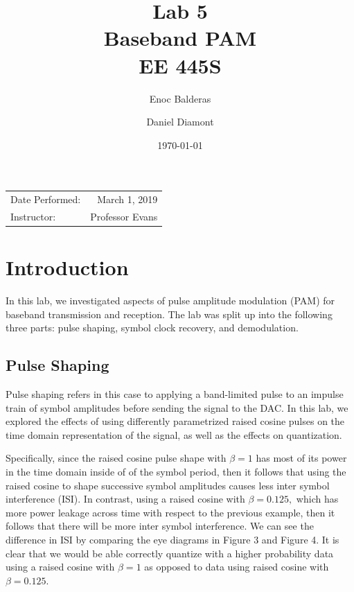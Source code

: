 \documentclass{article}
\title{Lab 5\\ Baseband PAM\\ EE 445S} %
\author{Enoc Balderas\\
        \and
        Daniel Diamont\\} %
\date{\today} %
\begin{document}
\maketitle %

\begin{center}
\begin{tabular}{l r}
Date Performed: & March 1, 2019 \\ %
Instructor: & Professor Evans %
\end{tabular}
\end{center}



\section{Introduction}

In this lab, we investigated aspects of pulse amplitude modulation (PAM) for baseband transmission and reception. The lab was split up into the following three parts: pulse shaping, symbol clock recovery, and demodulation.

\subsection{Pulse Shaping}
Pulse shaping refers in this case to applying a band-limited pulse to an impulse train of symbol amplitudes before sending the signal to the DAC. In this lab, we explored the effects of using differently parametrized raised cosine pulses on the time domain representation of the signal, as well as the effects on quantization.

Specifically, since the raised cosine pulse shape with $ \beta = 1 $ has most of its power in the time domain inside of of the symbol period, then it follows that using the raised cosine to shape successive symbol amplitudes causes less inter symbol interference (ISI). In contrast, using a raised cosine with $ \beta = 0.125, $ which has more power leakage across time with respect to the previous example, then it follows that there will be more inter symbol interference. We can see the difference in ISI by comparing the eye diagrams in Figure 3 and Figure 4. It is clear that we would be able correctly quantize with a higher probability data using a raised cosine with $ \beta = 1 $ as opposed to data using raised cosine with $ \beta = 0.125. $
\end{document}
